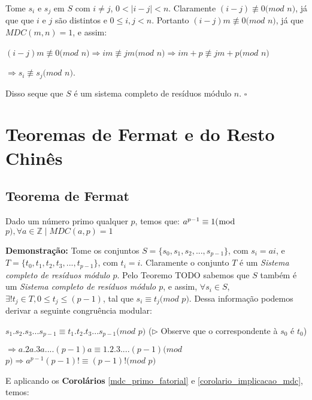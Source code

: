 Tome $s_i$ e $s_j$ em $S$ com $i\neq j$, $0 < |i-j| < n$. Claramente $(i-j)\not\equiv 0(mod$ $n)$, já que que $i$ e $j$ são distintos e $0 \leq i,j < n$.
Portanto $(i-j)m\not\equiv 0(mod$ $n)$, já que $MDC(m,n)=1$, e assim:

$(i-j)m\not\equiv 0(mod$ $n) \Rightarrow im \not\equiv jm(mod$ $n) \Rightarrow im+p \not\equiv jm+p(mod$ $n)$

$\Rightarrow s_i \not\equiv s_j(mod$ $n)$.

Disso seque que $S$ é um sistema completo de resíduos módulo $n$. $\square$



\section{Teoremas de Fermat e do Resto Chinês}

\subsection{Teorema de Fermat}

\begin{theorem}\label{teorema_fermat}
Dado um número primo qualquer $p$, temos que: 
$a^{p-1} \equiv 1 (\bmod$ $p), \forall a \in \mathbb{Z} \mid MDC(a, p) = 1$
\end{theorem}
\textbf{Demonstração:}
Tome os conjuntos $S = \{s_0, s_1, s_2, ..., s_{p-1}\}$, com $s_i = ai$, e $T = \{t_0, t_1, t_2, t_3, ..., t_{p-1}\}$, com $t_i = i$. 
Claramente o conjunto $T$ é um \textit{Sistema completo de resíduos módulo $p$}.
Pelo Teoremo TODO sabemos que $S$ também é um \textit{Sistema completo de resíduos módulo $p$},
e assim, $\forall s_i\in S$, $\exists! t_j\in T, 0\leq t_j\leq(p-1)$, tal que $s_i\equiv t_j(mod$ $p)$. Dessa informação podemos derivar a seguinte congruência modular:

$s_1.s_2.s_3...s_{p-1} \equiv t_1.t_2.t_3...s_{p-1} (mod$ $p)$ ($\triangleright$ Observe que o correspondente à $s_0$ é $t_0$)

$\Rightarrow a.2a.3a....(p-1)a \equiv 1.2.3....(p-1) (mod$ $p) \Rightarrow a^{p-1}(p-1)! \equiv (p-1)! (mod$ $p)$

E aplicando os \textbf{Corolários} \autoref{mdc_primo_fatorial} e \autoref{corolario_implicacao_mdc}, temos:

